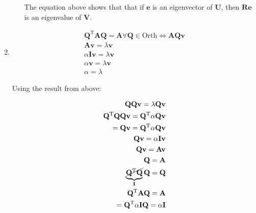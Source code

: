 \begin{problem}
\begin{enumerate}
\begin{enumerate}
                
                The equation above shows that that if $\mathbf{e}$ is an eigenvector of $\mathbf{U}$, then $\mathbf{Re}$ is an eigenvalue of $\mathbf{V}$.
               
            \end{enumerate}
            \item 
            \begin{align}
            \mathbf{Q}^{\text{T}}\mathbf{A}\mathbf{Q}=\mathbf{A}\forall \mathbf{Q}\in \text{Orth}\iff \mathbf{A}\mathbf{Q}\mathbf{v} \\
            \mathbf{A}\mathbf{v}=\lambda \mathbf{v} \\
            \alpha \mathbf{I}\mathbf{v}=\lambda \mathbf{v} \\
            \alpha \mathbf{v}=\lambda \mathbf{v} \\
            \alpha=\lambda
            \end{align}
            
            Using the result from above:
            
            
            \begin{align}
            \mathbf{QQ}\mathbf{v}=\lambda \mathbf{Qv} \\
            \mathbf{Q}^{\text{T}}\mathbf{QQv}=\mathbf{Q}^{\text{T}}\alpha \mathbf{Qv} \\
            =\mathbf{Qv}=\mathbf{Q}^{\text{T}}\alpha \mathbf{Qv} \\
            \mathbf{Qv}=\alpha \mathbf{Iv} \\
            \mathbf{Qv}=\mathbf{Av} \\
            \mathbf{Q}=\mathbf{A} \\
            \underbrace{ \cancel{ \mathbf{Q}^{\text{T}}\mathbf{Q} } }_{ \mathbf{I} }\mathbf{Q}=\mathbf{Q} \\
            \mathbf{Q}^{\text{T}}\mathbf{A}\mathbf{Q}=\mathbf{A}  \\
            =\mathbf{Q}^{\text{T}}\alpha \mathbf{I}\mathbf{Q}=\alpha \mathbf{I} \\
            \end{align}
    \end{enumerate}


    
\end{problem}
\pagebreak